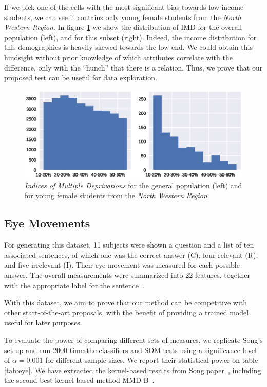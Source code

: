 If we pick one of the cells with the most significant bias towards low-income students,
we can see it contains only young female students from the \emph{North Western Region}.
In figure \ref{fig:oulad_hist} we show the distribution of IMD for the overall population (left),
and for this subset (right). Indeed, the income distribution for this demographics is
heavily skewed towards the low end. We could obtain this hindsight without prior knowledge of which
attributes correlate with the difference, only with the ``hunch'' that
there is a relation. Thus, we prove that our proposed test can be useful for data exploration.

\begin{figure}[htbp]
    \centering
    \includegraphics[width=\textwidth]{images/4_som/imd_histogram.eps}
    \caption{\emph{Indices of Multiple Deprivations} for the general population (left) and for
    young female students from the \emph{North Western Region}.}
    \label{fig:oulad_hist}
\end{figure}

\subsection{Eye Movements}
\label{subsec:som_eye}
For generating this dataset, 11 subjects were shown a question and a list of ten 
associated sentences, of which one was the correct answer (C), four relevant (R), and five
irrelevant (I). Their eye movement was measured for each possible answer.
The overall measurements were summarized into 22 features, together with the
appropriate label for the sentence~\cite{salojarvi2005inferring}.

With this dataset, we aim to prove that our method can be competitive with other
start-of-the-art proposals, with the benefit of providing a trained model useful for
later purposes.

To evaluate the power of comparing different sets of measures, we replicate Song's
set up and run 2000 times\footnotemark the classifiers and SOM tests using a significance
level of $\alpha = 0.001$ for different sample sizes.
We report their statistical power on table \ref{tab:eye}. We have extracted the kernel-based
results from Song \etal paper~\cite{song2021fast}, including the second-best kernel
based method MMD-B~\cite{zaremba2013b}.


